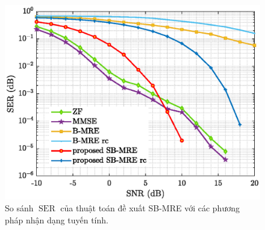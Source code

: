 \begin{figure}[ht]
    \centering
    \includegraphics[width=\linewidth]{figures/performance.eps}
    \caption{So sánh $\operatorname{SER}$ của thuật toán đề xuất SB-MRE với các phương pháp nhận dạng tuyến tính.}
    \label{fig:performance}
\end{figure}

